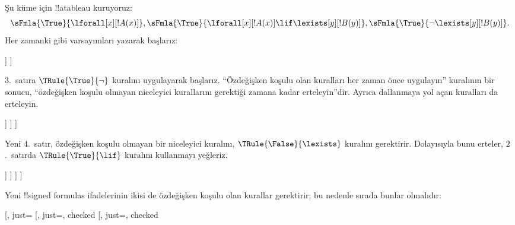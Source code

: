\documentclass[../../../include/open-logic-section]{subfiles}
\begin{document}
\begin{ex}
Şu küme için !!a{tableau} kuruyoruz:
\[
\sFmla{\True}{\lforall[x][!A(x)]}, \sFmla{\True}{\lforall[x][!A(x)] 
  \lif \lexists[y][!B(y)]}, \sFmla{\True}{\lnot\lexists[y][!B(y)]}.
\]
Her zamanki gibi varsayımları yazarak başlarız:
\begin{oltableau}
  [\sFmla{\True}{\lforall[x][\formula{A}(x)]}, just=\TAss
    [\sFmla{\True}{\lforall[x][\formula{A}(x)] \lif
        \lexists[y][\formula{B}(y)]}, just=\TAss
      [\sFmla{\True}{\lnot\lexists[y][\formula{B}(y)]}, just=\TAss
      ]
    ]
  ]
\end{oltableau}
$3$.~satıra $\TRule{\True}{\lnot}$ kuralını uygulayarak başlarız.
``Özdeğişken koşulu olan kuralları her zaman önce uygulayın'' kuralının bir
sonucu, ``özdeğişken koşulu olmayan niceleyici kurallarını gerektiği zamana
kadar erteleyin''dir. Ayrıca dallanmaya yol açan kuralları da erteleyin.
\begin{oltableau}
  [\sFmla{\True}{\lforall[x][\formula{A}(x)]}, just=\TAss
    [\sFmla{\True}{\lforall[x][\formula{A}(x)] \lif
        \lexists[y][\formula{B}(y)]}, just=\TAss
      [\sFmla{\True}{\lnot\lexists[y][\formula{B}(y)]}, just=\TAss, checked
        [\sFmla{\False}{\lexists[y][\formula{B}(y)]}, just={\TRule{\True}{\lnot}[3]}]
      ]
    ]
  ]
\end{oltableau}
Yeni $4$.~satır, özdeğişken koşulu olmayan bir niceleyici kuralını,
$\TRule{\False}{\lexists}$ kuralını gerektirir. Dolayısıyla bunu erteler,
$2$.~satırda $\TRule{\True}{\lif}$ kuralını kullanmayı yeğleriz.
\begin{oltableau}
  [\sFmla{\True}{\lforall[x][\formula{A}(x)]}, just=\TAss
    [\sFmla{\True}{\lforall[x][\formula{A}(x)] \lif
        \lexists[y][\formula{B}(y)]}, just=\TAss, checked
      [\sFmla{\True}{\lnot\lexists[y][\formula{B}(y)]}, just=\TAss, checked
        [\sFmla{\False}{\lexists[y][\formula{B}(y)]},
          just={\TRule{\True}{\lnot}[3]},
          [\sFmla{\False}{\lforall[x][\formula{A}(x)]}, just={\TRule{\True}{\lif}[2]}]
          [\sFmla{\True}{\lexists[y][\formula{B}(y)]}, just={\TRule{\True}{\lif}[2]}]
        ]
      ]
    ]
  ]
\end{oltableau}
Yeni !!{signed formula}s ifadelerinin ikisi de özdeğişken koşulu olan
kurallar gerektirir; bu nedenle sırada bunlar olmalıdır:
\begin{oltableau}
  [\sFmla{\True}{\lforall[x][\formula{A}(x)]}, just=\TAss
    [\sFmla{\True}{\lforall[x][\formula{A}(x)] \lif
        \lexists[y][\formula{B}(y)]}, just=\TAss, checked
      [\sFmla{\True}{\lnot\lexists[y][\formula{B}(y)]}, just=\TAss, checked

\end{oltableau}
\end{ex}
\end{document}
